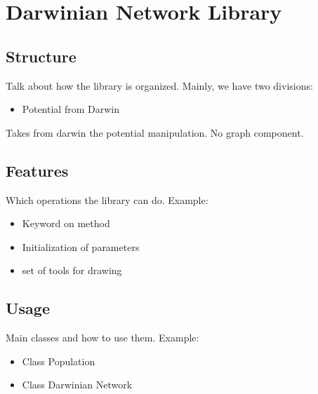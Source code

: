\chapter{Darwinian Network Library}
\label{sec:dn_lib}


\section{Structure}
\label{sec:system:sec1}

Talk about how the library is organized.
Mainly, we have two divisions:

\begin{itemize}
  \item Potential from Darwin
\end{itemize}

Takes from darwin the potential manipulation.
No graph component.

\section{Features}
\label{sec:system:sec2}

Which operations the library can do.
Example:

\begin{itemize}
  \item Keyword on method
  \item Initialization of parameters
  \item set of tools for drawing
\end{itemize}

\section{Usage}
\label{sec:system:sec3}

Main classes and how to use them.
Example:

\begin{itemize}
  \item Class Population
  \item Class Darwinian Network
\end{itemize}